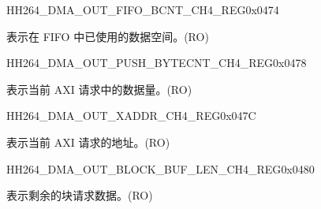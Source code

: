\begin{register}{H}{H264\_DMA\_OUT\_FIFO\_BCNT\_CH4\_REG}{0x0474}\label{regdesc:H264DMAOUTFIFOBCNTCH4REG}
%
%
\regnewline%
\begin{regdesc}\begin{reglist}
\label{fielddesc:H264DMAOUTCMDFIFOOUTFIFOBCNTCH4}\item [H264\_DMA\_OUT\_CMDFIFO\_OUTFIFO\_BCNT\_CH4] 表示在 FIFO 中已使用的数据空间。(RO)
\end{reglist}\end{regdesc}
\end{register}


\begin{register}{H}{H264\_DMA\_OUT\_PUSH\_BYTECNT\_CH4\_REG}{0x0478}\label{regdesc:H264DMAOUTPUSHBYTECNTCH4REG}
%
%
\regnewline%
\begin{regdesc}\begin{reglist}
\label{fielddesc:H264DMAOUTCMDFIFOPUSHBYTECNTCH4}\item [H264\_DMA\_OUT\_CMDFIFO\_PUSH\_BYTECNT\_CH4] 表示当前 AXI 请求中的数据量。(RO)
\end{reglist}\end{regdesc}
\end{register}


\begin{register}{H}{H264\_DMA\_OUT\_XADDR\_CH4\_REG}{0x047C}\label{regdesc:H264DMAOUTXADDRCH4REG}
%
\regnewline%
\begin{regdesc}\begin{reglist}
\label{fielddesc:H264DMAOUTCMDFIFOXADDRCH4}\item [H264\_DMA\_OUT\_CMDFIFO\_XADDR\_CH4] 表示当前 AXI 请求的地址。(RO)
\end{reglist}\end{regdesc}
\end{register}


\begin{register}{H}{H264\_DMA\_OUT\_BLOCK\_BUF\_LEN\_CH4\_REG}{0x0480}\label{regdesc:H264DMAOUTBLOCKBUFLENCH4REG}
%
%
\regnewline%
\begin{regdesc}\begin{reglist}
\label{fielddesc:H264DMAOUTBLOCKBUFLENCH4}\item [H264\_DMA\_OUT\_BLOCK\_BUF\_LEN\_CH4] 表示剩余的块请求数据。(RO)
\end{reglist}\end{regdesc}
\end{register}

